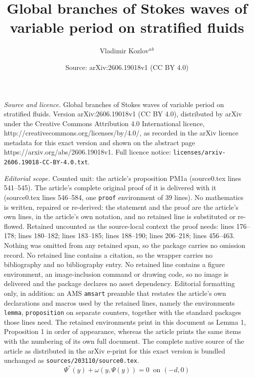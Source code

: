 \documentclass[10pt,a4paper]{amsart}
\title{Global branches of Stokes waves of variable period on stratified fluids}
\author{Vladimir Kozlov$^a$$^b$}
\date{Source: arXiv:2606.19018v1 (CC BY 4.0)}
\begin{document}
\maketitle

\noindent\emph{Source and licence.} Global branches of Stokes waves of variable period on stratified fluids. Version arXiv:2606.19018v1 (CC BY 4.0), distributed by arXiv under the Creative Commons Attribution 4.0 International licence, http://creativecommons.org/licenses/by/4.0/, as recorded in the arXiv licence metadata for this exact version and shown on the abstract page https://arxiv.org/abs/2606.19018v1. Full licence notice: \texttt{licenses/arxiv-2606.19018-CC-BY-4.0.txt}.\par\smallskip

\noindent\textit{Editorial scope.} Counted unit: the article's proposition PM1a (source0.tex lines 541--545). The article's complete original proof of it is delivered with it (source0.tex lines 546--584, one \texttt{proof} environment of 39 lines). No mathematics is written, repaired or re-derived: the statement and the proof are the article's own lines, in the article's own notation, and no retained line is substituted or re-flowed.  Retained uncounted as the source-local context the proof needs: lines 176--178; lines 180--182; lines 183--185; lines 188--190; lines 206--218; lines 456--463.  Nothing was omitted from any retained span, so the package carries no omission record.  No retained line contains a citation, so the wrapper carries no bibliography and no bibliography entry.  No retained line contains a figure environment, an image-inclusion command or drawing code, so no image is delivered and the package declares no asset dependency.  Editorial formatting only, in addition: an AMS \texttt{amsart} preamble that restates the article's own declarations and macros used by the retained lines, namely the environments \texttt{lemma}, \texttt{proposition} on separate counters, together with the standard packages those lines need.  The retained environments print in this document as Lemma 1, Proposition 1 in order of appearance, whereas the article prints the same items with the numbering of its own full document.  The complete native source of the article as distributed in the arXiv e-print for this exact version is bundled unchanged as \texttt{sources/203110/source0.tex}.
\begin{equation}\label{J18aa}
\Psi^{''}(y)+\omega(y,\Psi(y))=0\;\;\mbox{on $(-d,0)$}
\end{equation}
\end{document}
